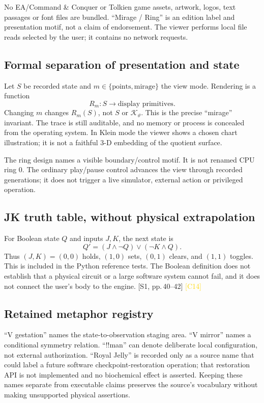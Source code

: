 \documentclass[11pt,a4paper]{article}
\newcommand{\src}[2]{\textcolor{muted}{[#1, #2]}}
\newcommand{\corr}[1]{\textcolor{gold}{\textsf{[#1]}}}
\begin{document}
No EA/Command \& Conquer or Tolkien game assets, artwork, logos, text passages or font files are bundled. ``Mirage / Ring'' is an edition label and presentation motif, not a claim of endorsement. The viewer performs local file reads selected by the user; it contains no network requests.

\subsection{Formal separation of presentation and state}
Let $S$ be recorded state and $m\in\{\text{points},\text{mirage}\}$ the view mode. Rendering is a function
\begin{equation}
 R_m:S\longrightarrow\text{display primitives}.
\end{equation}
Changing $m$ changes $R_m(S)$, not $S$ or $\mathcal K_\vartheta$. This is the precise ``mirage'' invariant. The trace is still auditable, and no memory or process is concealed from the operating system. In Klein mode the viewer shows a chosen chart illustration; it is not a faithful 3-D embedding of the quotient surface.

The ring design names a visible boundary/control motif. It is not renamed CPU ring 0. The ordinary play/pause control advances the view through recorded generations; it does not trigger a live simulator, external action or privileged operation.

\subsection{JK truth table, without physical extrapolation}
For Boolean state $Q$ and inputs $J,K$, the next state is
\begin{equation}
 Q'=(J\land\neg Q)\lor(\neg K\land Q).
\end{equation}
Thus $(J,K)=(0,0)$ holds, $(1,0)$ sets, $(0,1)$ clears, and $(1,1)$ toggles. This is included in the Python reference tests. The Boolean definition does not establish that a physical circuit or a large software system cannot fail, and it does not connect the user's body to the engine. \src{S1}{pp.\,40--42} \corr{C14}

\subsection{Retained metaphor registry}
``V gestation'' names the state-to-observation staging area. ``V mirror'' names a conditional symmetry relation. ``!!man'' can denote deliberate local configuration, not external authorization. ``Royal Jelly'' is recorded only as a source name that could label a future software checkpoint-restoration operation; that restoration API is not implemented and no biochemical effect is asserted. Keeping these names separate from executable claims preserves the source's vocabulary without making unsupported physical assertions.
\clearpage
\end{document}
